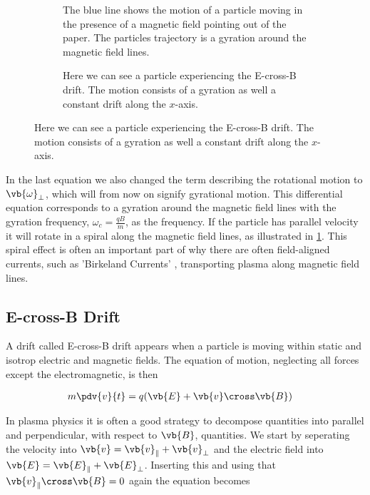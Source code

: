 		\begin{figure}
			\centering
			\begin{subfigure}{0.45\textwidth}
				
				\caption{The blue line shows the motion of a particle moving in the presence of a magnetic
				field pointing out of the paper. The particles trajectory is a gyration around the magnetic field lines.}
				\label{fig:gyration}
			\end{subfigure}
			\begin{subfigure}{0.45\textwidth}
				\caption{Here we can see a particle experiencing the E-cross-B drift. The motion consists of a gyration
				as well a constant drift along the \(x\)-axis.}
				\label{fig:EcrossB}
			\end{subfigure}
		\end{figure}


		In the last equation we also changed the term describing the rotational motion
		to \(\vb{\omega}_\perp\), which will from now on signify gyrational motion.
		This differential equation corresponds to a gyration around the magnetic field lines
		with the gyration frequency, \(\omega_c = \frac{qB}{m}\), as the frequency. If the particle
		has parallel velocity it will rotate in a spiral along the magnetic field lines, as illustrated in
		\cref{fig:gyration}. This spiral effect is often an important part of why
		there are often field-aligned currents, such as 'Birkeland Currents' \citep{cummings_field-aligned_1967},
		transporting plasma along magnetic field lines.



	\subsection{E-cross-B Drift}
	A drift called E-cross-B drift appears when a particle is moving within static and isotrop
	electric and magnetic fields. The equation of motion, neglecting all forces
	except the electromagnetic, is then

	\begin{align}
		m\pdv{v}{t} &= q(\vb{E} + \vb{v}\cross\vb{B}) \label{eq:EcrossB}
	\end{align}

	In plasma physics it is often a good strategy to decompose quantities into
	parallel and perpendicular, with respect to \(\vb{B}\), quantities. We start by seperating the
	velocity into \(\vb{v} = \vb{v}_\parallel + \vb{v}_\perp\) and the electric field
	into \(\vb{E} = \vb{E}_\parallel + \vb{E}_\perp\). Inserting this and using that \(\vb{v}_\parallel\cross\vb{B}=0\)
	again the equation becomes


